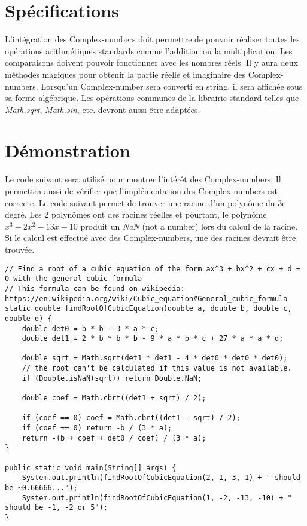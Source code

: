 \section{Spécifications}

L'intégration des \glspl{Complex-number} doit permettre de pouvoir réaliser toutes les opérations arithmétiques standards comme l'addition ou la multiplication. Les comparaisons doivent pouvoir fonctionner avec les nombres réels. Il y aura deux méthodes magiques pour obtenir la partie réelle et imaginaire des \glspl{Complex-number}. Lorsqu'un \gls{Complex-number} sera converti en string, il sera affichée sous sa forme algébrique. Les opérations communes de la librairie standard telles que \textit{Math.sqrt}, \textit{Math.sin}, etc. devront aussi être adaptées.

\section{Démonstration}

Le code suivant sera utilisé pour montrer l'intérêt des \glspl{Complex-number}. Il permettra aussi de vérifier que l'implémentation des \glspl{Complex-number} est correcte. Le code suivant permet de trouver une racine d'un polynôme du 3e degré. Les 2 polynômes ont des racines réelles et pourtant, le polynôme $x^3 - 2x^2 - 13x - 10$ produit un \textit{NaN} (not a number) lors du calcul de la racine. Si le calcul est effectué avec des \glspl{Complex-number}, une des racines devrait être trouvée.
\begin{verbatim}
// Find a root of a cubic equation of the form ax^3 + bx^2 + cx + d = 0 with the general cubic formula
// This formula can be found on wikipedia: https://en.wikipedia.org/wiki/Cubic_equation#General_cubic_formula
static double findRootOfCubicEquation(double a, double b, double c, double d) {
    double det0 = b * b - 3 * a * c;
    double det1 = 2 * b * b * b - 9 * a * b * c + 27 * a * a * d;

    double sqrt = Math.sqrt(det1 * det1 - 4 * det0 * det0 * det0);
    // the root can't be calculated if this value is not available.
    if (Double.isNaN(sqrt)) return Double.NaN;

    double coef = Math.cbrt((det1 + sqrt) / 2);

    if (coef == 0) coef = Math.cbrt((det1 - sqrt) / 2);
    if (coef == 0) return -b / (3 * a);
    return -(b + coef + det0 / coef) / (3 * a);
}

public static void main(String[] args) {
    System.out.println(findRootOfCubicEquation(2, 1, 3, 1) + " should be ~0.66666...");
    System.out.println(findRootOfCubicEquation(1, -2, -13, -10) + " should be -1, -2 or 5");
}
\end{verbatim}